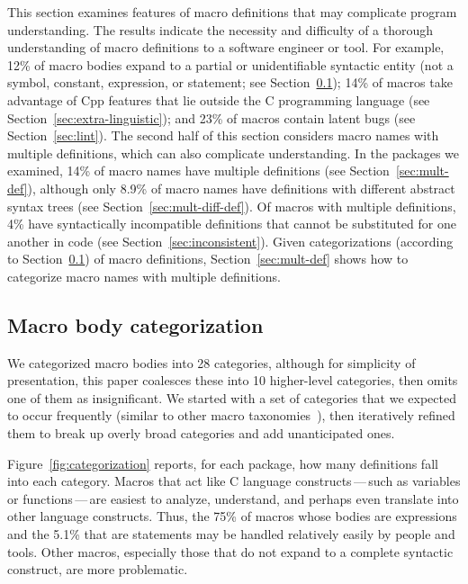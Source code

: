 \documentclass[10pt]{article}
\begin{document}
This section examines features of macro definitions that may complicate
program understanding.  The results indicate the necessity and difficulty
of a thorough understanding of macro definitions to a software engineer or
tool.  For example, 12\% of macro bodies expand to a partial or
unidentifiable syntactic entity (not a symbol, constant, expression, or
statement; see Section~\ref{sec:categorization}); 14\% of macros take
advantage of Cpp features that lie outside the C programming language (see
Section~\ref{sec:extra-linguistic}); and 23\% of macros contain latent bugs
(see Section~\ref{sec:lint}).  The second half of this section considers
macro names with multiple definitions, which can also complicate
understanding.  In the packages we examined, 14\% of macro names have multiple
definitions (see Section~\ref{sec:mult-def}), although only 8.9\% of macro
names have definitions with different abstract syntax trees (see
Section~\ref{sec:mult-diff-def}).  Of macros with multiple definitions, 4\%
have syntactically incompatible definitions that cannot be substituted for
one another in code (see Section~\ref{sec:inconsistent}).  Given
categorizations (according to Section~\ref{sec:categorization}) of macro
definitions, Section~\ref{sec:mult-def} shows how to categorize macro names
with multiple definitions.


\subsection{Macro body categorization}
\label{sec:categorization}

We categorized macro bodies into 28 categories, although for simplicity of
presentation, this paper coalesces these into 10 higher-level categories,
then omits one of them as insignificant.
We started with a set of categories that we expected to occur frequently
(similar to other macro
taxonomies~\cite{Stroustrup-DesignEvolution,Carroll95}), then iteratively
refined them to break up overly broad categories and add unanticipated ones.


Figure~\ref{fig:categorization} reports, for each package, how many
definitions fall into each category.  Macros that
act like C language constructs\,---\,such as variables or
functions\,---\,are easiest to analyze, understand, and perhaps even
translate into other language constructs.  Thus, 
the 75\% of macros whose bodies are expressions and the 5.1\% that are
statements may be handled relatively easily by people and tools.  Other
macros, especially those that do not expand to a complete syntactic
construct, are more problematic.
\end{document}
